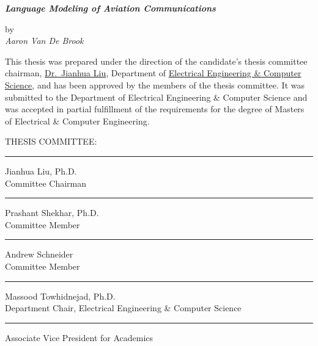 \documentclass[12pt]{article}
\begin{document}
\begin{center}
    \LARGE
    \textbf{
        \textit{
            Language Modeling of Aviation Communications\\
        }
    }

    \vspace*{0.2in}

    \normalsize
    by\\
    \textit{Aaron Van De Brook}\\

    \vspace*{0.25in}

\end{center}
This thesis was prepared under the direction of the candidate's thesis
committee chairman, \underline{Dr.~Jianhua Liu}, Department of \underline{Electrical Engineering \&
    Computer Science}, and has been approved by the members of the thesis committee.
It was submitted to the Department of Electrical Engineering \& Computer Science
and was accepted in partial fulfillment of the requirements for the degree of
Masters of Electrical \& Computer Engineering.

\begin{center}
    \begin{minipage}{3in}
        \vspace*{0.25in}
        THESIS COMMITTEE:\\
        \vspace*{0.25in}
        \hrule
        \vspace*{2pt}
        Jianhua Liu, Ph.D.\\
        Committee Chairman\\
        \vspace*{0.75in}
        \hrule
        \vspace*{2pt}
        Prashant Shekhar, Ph.D.\\
        Committee Member\\
        \vspace*{0.75in}
        \hrule
        \vspace*{2pt}
        Andrew Schneider\\
        Committee Member\\
        \vspace*{0.75in}
        \hrule
        \vspace*{2pt}
        Massood Towhidnejad, Ph.D.\\
        Department Chair, Electrical Engineering \& Computer Science\\
        \vspace*{0.75in}
        \hrule
        \vspace*{2pt}
        Associate Vice President for Academics
    \end{minipage}
\end{center}
\newpage
\tableofcontents
\newpage
\doublespacing{}
\end{document}
